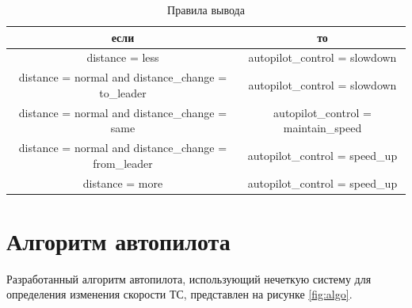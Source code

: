 \documentclass[12pt]{report}
\begin{document}
\begin{table} [h!]
	\caption{Правила вывода} 
 \label{table:vel}
	\begin{center}
	\begin{tabular}{|c c|}
\hline если  & то  \\
\hline distance = less & autopilot\_control = slowdown \\
\hline distance = normal and distance\_change = to\_leader & autopilot\_control = slowdown \\
\hline distance = normal and distance\_change = same & autopilot\_control = maintain\_speed \\
\hline distance = normal and distance\_change = from\_leader & autopilot\_control = speed\_up \\
\hline distance = more & autopilot\_control = speed\_up \\
\hline
	\end{tabular}
	\end{center}
\end{table}

\section{Алгоритм автопилота}
Разработанный алгоритм автопилота, использующий нечеткую систему для определения изменения скорости ТС, представлен на рисунке \ref{fig:algo}.
\end{document}
